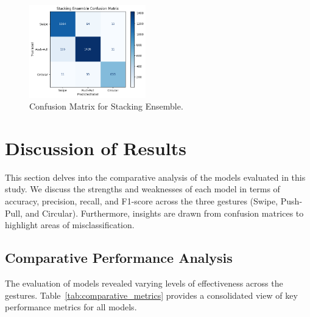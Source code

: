 \documentclass[10pt,twocolumn,letterpaper]{article}
\begin{document}
\begin{figure}[h]
  \centering
  \includegraphics[width=0.45\textwidth]{figures/confusion_matrix_stacking.png}
  \caption{Confusion Matrix for Stacking Ensemble.}
  \label{fig:confusion_matrix_stacking}
\end{figure}


\section{Discussion of Results}

This section delves into the comparative analysis of the models evaluated in this study. We discuss the strengths and weaknesses of each model in terms of accuracy, precision, recall, and F1-score across the three gestures (Swipe, Push-Pull, and Circular). Furthermore, insights are drawn from confusion matrices to highlight areas of misclassification.

\subsection{Comparative Performance Analysis}

The evaluation of models revealed varying levels of effectiveness across the gestures. Table~\ref{tab:comparative_metrics} provides a consolidated view of key performance metrics for all models.
\end{document}
